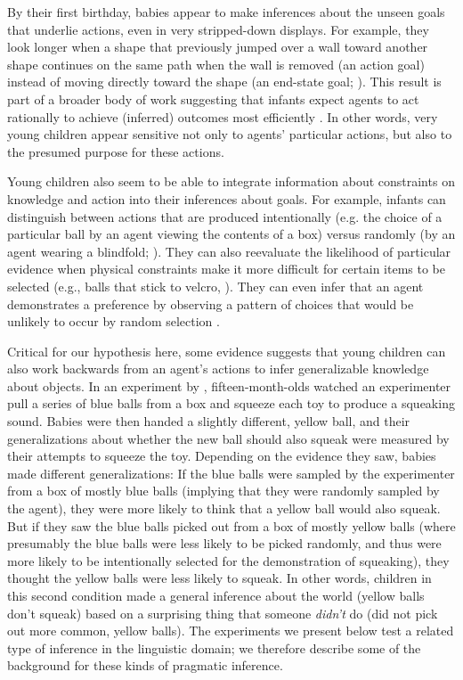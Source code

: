 \documentclass[man]{apa2}
\begin{document}

By their first birthday, babies appear to make inferences about the unseen goals that underlie actions, even in very stripped-down displays.  For example, they look longer when a shape that previously jumped over a wall toward another shape continues on the same path when the wall is removed (an action goal) instead of moving directly toward the shape (an end-state goal; ). This result is part of a broader body of work suggesting that infants expect agents to act rationally to achieve (inferred) outcomes most efficiently \cite{csibra1998, gergely2003}. In other words, very young children appear sensitive not only to agents' particular actions, but also to the presumed purpose for these actions. 

Young children also seem to be able to integrate information about constraints on knowledge and action into their inferences about goals. For example, infants can distinguish between actions that are produced intentionally (e.g. the choice of a particular ball by an agent viewing the contents of a box) versus randomly (by an agent wearing a blindfold; ).  They can also reevaluate the likelihood of particular evidence when physical constraints make it more difficult for certain items to be selected (e.g., balls that stick to velcro, ).  They can even infer that an agent demonstrates a preference by observing a pattern of choices that would be unlikely to occur by random selection \cite{kushnir2010}. 

Critical for our hypothesis here, some evidence suggests that young children can also work backwards from an agent's actions to infer generalizable knowledge about objects. In an experiment by , fifteen-month-olds watched an experimenter pull a series of blue balls from a box and squeeze each toy to produce a squeaking sound. Babies were then handed a slightly different, yellow ball, and their generalizations about whether the new ball should also squeak were measured by their attempts to squeeze the toy. Depending on the evidence they saw, babies made different generalizations: If the blue balls were sampled by the experimenter from a box of mostly blue balls (implying that they were randomly sampled by the agent), they were more likely to think that a yellow ball would also squeak. But if they saw the blue balls picked out from a box of mostly yellow balls (where presumably the blue balls were less likely to be picked randomly, and thus were more likely to be intentionally selected for the demonstration of squeaking), they thought the yellow balls were less likely to squeak. In other words, children in this second condition made a general inference about the world (yellow balls don't squeak) based on a surprising thing that someone \emph{didn't} do (did not pick out more common, yellow balls). The experiments we present below test a related type of inference in the linguistic domain; we therefore describe some of the background for these kinds of pragmatic inference. 
\end{document}
